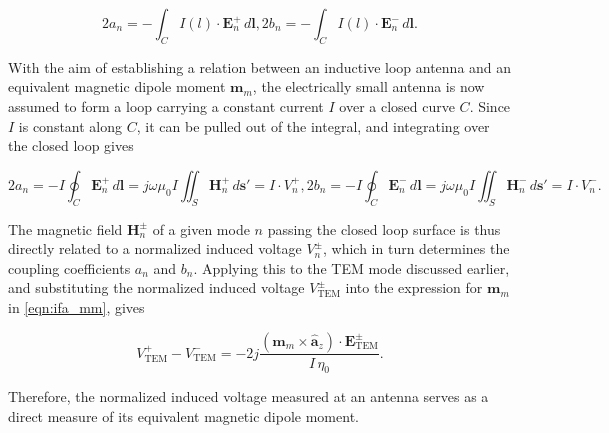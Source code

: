\begin{subequations}\label{eqn:e_int_ab}
	\begin{equation}
		2a_n=-\int_C I(l)\cdot \mathbf{E}_n^+\,d\mathbf{l},
		\label{eqn:e_int_a}
	\end{equation}
	\begin{equation}
		2b_n=-\int_C I(l)\cdot \mathbf{E}_n^-\,d\mathbf{l}.
		\label{eqn:e_int_b}
	\end{equation}
\end{subequations}

With the aim of establishing a relation between an inductive loop antenna and an 
equivalent magnetic dipole moment $\mathbf{m}_m$, the electrically small antenna is now assumed to form a loop carrying a constant current $I$ over a closed curve $C$. Since $I$ is constant along $C$, it can be pulled out of the integral, and integrating over the closed loop gives~\cite[p.~361]{Collin_2015}

\begin{subequations}\label{eqn:e_closed_int}
	\begin{equation}
		2a_n=-I\oint_C \mathbf{E}_n^+\,d\mathbf{l} = j\omega\mu_0I \iint_S 
		\mathbf{H}_n^+\,d\mathbf{s}'=I\cdot V_n^+,
		\label{eqn:e_a_closed_int}
	\end{equation}
	\begin{equation}
		2b_n=-I\oint_C \mathbf{E}_n^-\,d\mathbf{l} = j\omega\mu_0I \iint_S 
		\mathbf{H}_n^-\,d\mathbf{s}'=I\cdot V_n^-.
		\label{eqn:e_b_closed_int}
	\end{equation}
\end{subequations}

The magnetic field $\mathbf{H}_n^\pm$ of a given mode $n$ passing the closed loop surface is thus directly related to a normalized induced voltage $V^\pm_n$, which in turn determines the coupling coefficients $a_n$ and $b_n$. Applying this to the TEM mode discussed earlier, and substituting the normalized induced voltage $V^\pm_\mathrm{TEM}$ into the expression for $\mathbf{m}_m$ in \eqref{eqn:ifa_mm}, gives

\begin{equation}
	V^+_\mathrm{TEM} - V^-_\mathrm{TEM} = 
	-2j\frac{\left(\mathbf{m}_{m}\times\hat{\mathbf{a}}_z\right)
		\cdot\mathbf{E}_\mathrm{TEM}^\pm}{I\,\eta_0}.
	\label{eqn:m_v}
\end{equation}

Therefore, the normalized induced voltage measured at an antenna serves as a direct measure of its equivalent magnetic dipole moment.

